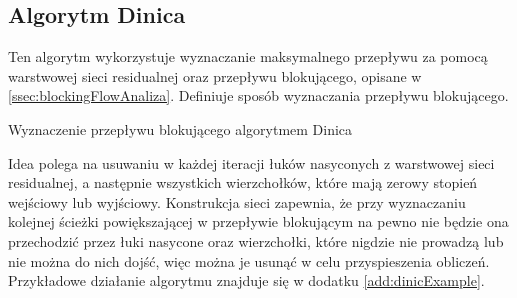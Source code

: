 \subsection{Algorytm Dinica}\label{ssec:dinicAnaliza}
Ten algorytm wykorzystuje wyznaczanie maksymalnego przepływu za pomocą warstwowej sieci residualnej oraz przepływu blokującego, opisane w \ref{ssec:blockingFlowAnaliza}. Definiuje sposób wyznaczania przepływu blokującego.
\begin{algorithm}[H]
	\caption{Wyznaczenie przepływu blokującego algorytmem Dinica}\label{dinicPseudo}
	\begin{algorithmic}
					\EndIf
				\EndFor
			\EndWhile
		\EndProcedure
	\end{algorithmic}
\end{algorithm}\noindent
Idea polega na usuwaniu w każdej iteracji łuków nasyconych z warstwowej sieci residualnej, a następnie wszystkich wierzchołków, które mają zerowy stopień wejściowy lub wyjściowy. Konstrukcja sieci zapewnia, że przy wyznaczaniu kolejnej ścieżki powiększającej w przepływie blokującym na pewno nie będzie ona przechodzić przez łuki nasycone oraz wierzchołki, które nigdzie nie prowadzą lub nie można do nich dojść, więc można je usunąć w celu przyspieszenia obliczeń. Przykładowe działanie algorytmu znajduje się w dodatku \ref{add:dinicExample}.
